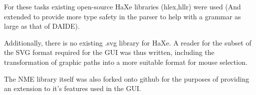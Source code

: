 \documentclass[pdftex,12pt,a4paper]{report}
\begin{document}
For these tasks existing open-source HaXe libraries (hlex,hllr) were used (And extended to provide more type safety in the parser to help with a grammar as large as that of DAIDE).

Additionally, there is no existing .svg library for HaXe. A reader for the subset of the SVG format required for the GUI was thus written, including the transformation of graphic paths into a more suitable format for mouse selection.

The NME library itself was also forked onto github for the purposes of providing an extension to it's features used in the GUI.
\end{document}
